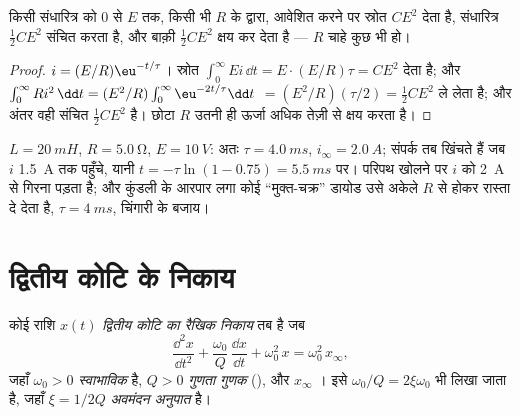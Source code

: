 \begin{proposition}[RC आवेशन का ऊर्जा-लेखा]\label{prop:b1:transient-regimes:rcenergy}
किसी संधारित्र को $0$ से $E$ तक, किसी भी  $R$ के द्वारा, आवेशित
करने पर स्रोत $CE^2$ देता है, संधारित्र $\tfrac12 CE^2$ संचित करता है, और
 बाक़ी $\tfrac12 CE^2$ क्षय कर देता है --- $R$ चाहे कुछ भी हो।
\end{proposition}

\begin{proof}
$i = (E/R)\eu^{-t/\tau}$।
स्रोत $\int_0^\infty Ei\,\dd t = E \cdot (E/R)\tau = CE^2$ देता है;
और 
$\int_0^\infty Ri^2\,\dd t = (E^2/R)\int_0^\infty \eu^{-2t/\tau}\dd t$
$= (E^2/R)(\tau/2) = \tfrac12 CE^2$ ले लेता है; और अंतर वही संचित $\tfrac12 CE^2$ है। छोटा $R$ उतनी ही ऊर्जा अधिक
तेज़ी से क्षय करता है।
\end{proof}

\begin{example}[रिले की कुंडली]\label{ex:b1:transient-regimes:relay}
$L = \qty{20}{mH}$, $R = \qty{5.0}{\ohm}$, $E = \qty{10}{V}$: अतः $\tau =
\qty{4.0}{ms}$, $i_\infty = \qty{2.0}{A}$; संपर्क तब खिंचते हैं जब
$i$ \qty{1.5}{A} तक पहुँचे, यानी $t = -\tau\ln(1 - 0.75) =
\qty{5.5}{ms}$ पर। परिपथ खोलने पर $i$ को \qty{2}{A} से गिरना पड़ता है; और
कुंडली के आरपार लगा कोई ``मुक्त-चक्र'' डायोड उसे अकेले $R$ से होकर रास्ता दे
देता है, $\tau = \qty{4}{ms}$, चिंगारी के बजाय।
\end{example}

\section{द्वितीय कोटि के निकाय}

\begin{definition}[द्वितीय कोटि का मानक रूप]\label{def:b1:transient-regimes:secondorder}
कोई राशि $x(t)$ \emph{द्वितीय कोटि का रैखिक निकाय} तब है जब
\[
\frac{\dd^2 x}{\dd t^2} + \frac{\omega_0}{Q}\,\frac{\dd x}{\dd t} + \omega_0^2\,x
= \omega_0^2\,x_\infty ,
\]
जहाँ $\omega_0 > 0$ \emph{स्वाभाविक } है, $Q > 0$
\emph{गुणता गुणक} (), और $x_\infty$ ।
इसे $\omega_0/Q = 2\xi\omega_0$ भी लिखा जाता है, जहाँ $\xi = 1/2Q$
\emph{अवमंदन अनुपात} है।
\end{definition}

